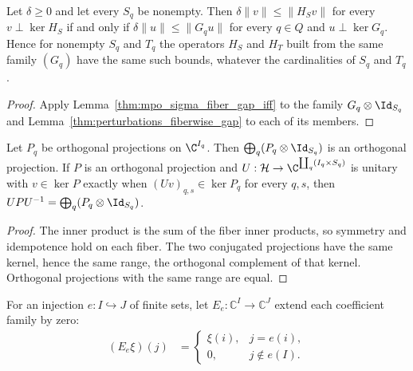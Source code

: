 \begin{lemma}
    \label{thm:mpo_dependent_spectator_gap_iff}
    \leanok
    Let $\delta\geq0$ and let every $S_q$ be nonempty. Then
    $\delta\|v\|\leq\|H_Sv\|$ for every $v\perp\ker H_S$ if and only if
    $\delta\|u\|\leq\|G_qu\|$ for every $q\in Q$ and $u\perp\ker G_q$. Hence
    for nonempty $S_q$ and $T_q$ the operators $H_S$ and $H_T$ built from the
    same family $(G_q)$ have the same such bounds, whatever the cardinalities of
    $S_q$ and $T_q$.
\end{lemma}
\begin{proof}
    \leanok
    Apply Lemma~\ref{thm:mpo_sigma_fiber_gap_iff} to the family
    $G_q\otimes\Id_{S_q}$ and Lemma~\ref{thm:perturbations_fiberwise_gap} to
    each of its members.
\end{proof}

\begin{lemma}
    \label{thm:mpo_dependent_orthogonal_projections}
    \leanok
    Let $P_q$ be orthogonal projections on $\C^{I_q}$. Then
    $\bigoplus_q(P_q\otimes\Id_{S_q})$ is an orthogonal projection.
    If $P$ is an orthogonal projection and
    $U:\mathcal H\to\C^{\coprod_q(I_q\times S_q)}$ is unitary with
    $v\in\ker P$ exactly when $(Uv)_{q,s}\in\ker P_q$ for every $q,s$,
    then $UPU^{-1}=\bigoplus_q(P_q\otimes\Id_{S_q})$.
\end{lemma}
\begin{proof}
    \leanok
    The inner product is the sum of the fiber inner products, so symmetry
    and idempotence hold on each fiber. The two conjugated projections
    have the same kernel, hence the same range, the orthogonal complement
    of that kernel. Orthogonal projections with the same range are equal.
\end{proof}

\begin{definition}
    \label{def:physical_euclidean_extension_zero}
    \leanok
    For an injection $e:I\hookrightarrow J$ of finite sets, let
    $E_e:\mathbb C^I\to\mathbb C^J$ extend each coefficient family by zero:
    \begin{align}
        (E_e\xi)(j) & =
        \begin{cases}
            \xi(i), & j=e(i),       \\
            0,      & j\notin e(I).
        \end{cases}
    \end{align}
\end{definition}

